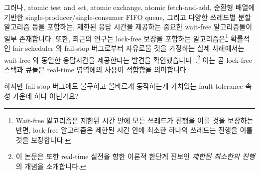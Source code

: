 그러나, atomic test and set, atomic exchange, atomic
fetch-and-add, 순환형 배열에 기반한 single-producer/single-consumer FIFO
queue, 그리고 다양한 쓰레드별 분할 알고리즘 등을 포함하는, 제한된 응답 시간을
제공하는 중요한 wait-free 알고리즘들이 일부 존재합니다.
또한, 최근의 연구는 lock-free 보장을 포함하는 알고리즘은\footnote{
	Wait-free 알고리즘은 제한된 시간 안에 모든 쓰레드가 진행을 이룰 것을
	보장하는 반면, lock-free 알고리즘은 제한된 시간 안에 최소한 하나의
	쓰레드는 진행을 이룰 것을 보장합니다.}
확률적인 fair scheduler 와 fail-stop 버그로부터 자유로울 것을 가정하는 실제
사례에서는 wait-free 와 동일한 응답시간을 제공한다는 발견을
확인했습니다~\cite{DanAlitarh2013PracticalProgress}.\footnote{
	이 논문은 또한 real-time 실전을 향한 이론적 한단계 진보인 \emph{제한된
	최소한의 진행} 의 개념을 소개합니다.}
이는 곧 lock-free 스택과 큐들은 real-time 영역에의 사용이 적합함을 의미합니다.

\QuickQuiz{}
	하지만 fail-stop 버그에도 불구하고 올바르게 동작하는게 가치있는
	fault-tolerance 속성 가운데 하나 아닌가요?
	\iffalse


